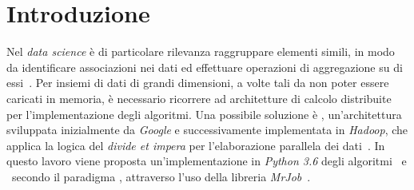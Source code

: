 \documentclass[runningheads]{llncs}
\begin{document}
\section{Introduzione}
Nel \textit{data science} è di particolare rilevanza raggruppare elementi simili, in modo da identificare associazioni nei dati ed effettuare operazioni di aggregazione su di essi~\cite{tan2005}.
Per insiemi di dati di grandi dimensioni, a volte tali da non poter essere caricati in memoria, è necessario ricorrere ad architetture di calcolo distribuite per l'implementazione degli algoritmi.
Una possibile soluzione è \mr, un'architettura sviluppata inizialmente da \textit{Google} e successivamente implementata in \textit{Hadoop}, che applica la logica del \textit{divide et impera} per l'elaborazione parallela dei dati~\cite{lin}.
In questo lavoro viene proposta un'implementazione in \textit{Python 3.6} degli algoritmi \km\ e \fcm\ secondo il paradigma \mr, attraverso l'uso della libreria \textit{MrJob}~\cite{marin2020}.
\end{document}
